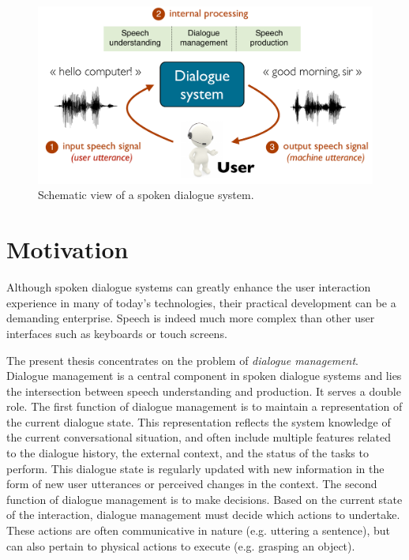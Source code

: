 \begin{figure}[h]
\center
\includegraphics[scale=0.46]{imgs/basicsds.pdf}
\caption{Schematic view of a spoken dialogue system.}
\label{fig:basicsds}
\end{figure}

\section{Motivation}

Although spoken dialogue systems can greatly enhance the user interaction experience in many of today's technologies, their practical development can be a demanding enterprise. Speech is indeed much more complex than other user interfaces such as keyboards or touch screens.  

The present thesis concentrates on the problem of \textit{dialogue management}.  Dialogue management is a central component in spoken dialogue systems and lies the intersection between speech understanding and production.  It serves a double role. The first function of dialogue management is to maintain a representation of the current dialogue state. This representation reflects the system knowledge of the current conversational situation, and often include multiple features related to the dialogue history, the external context, and the status of the tasks to perform.  This dialogue state is regularly updated with new information in the form of new user utterances or perceived changes in the context. The second function of dialogue management is to make decisions.  Based on the current state of the interaction, dialogue management must decide which actions to undertake. These actions are often communicative in nature (e.g. uttering a sentence), but can also pertain to physical actions to execute (e.g. grasping an object).  

